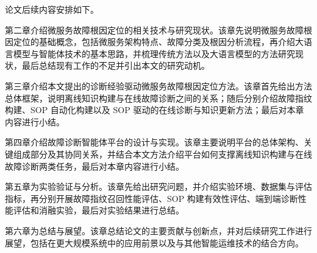 论文后续内容安排如下。

第二章介绍微服务故障根因定位的相关技术与研究现状。该章先说明微服务故障根因定位的基础概念，包括微服务架构特点、故障分类及根因分析流程，再介绍大语言模型与智能体技术的基本思路，并梳理传统方法以及大语言模型的方法研究现状，最后总结现有工作的不足并引出本文的研究动机。

第三章介绍本文提出的诊断经验驱动微服务故障根因定位方法。该章首先给出方法总体框架，说明离线知识构建与在线故障诊断之间的关系；随后分别介绍故障指纹构建、SOP 自动化构建以及 SOP 驱动的在线诊断与知识更新方法；最后对本章内容进行小结。

第四章介绍故障诊断智能体平台的设计与实现。该章主要说明平台的总体架构、关键组成部分及其协同关系，并结合本文方法介绍平台如何支撑离线知识构建与在线故障诊断两类任务，最后对本章内容进行小结。

第五章为实验验证与分析。该章先给出研究问题，并介绍实验环境、数据集与评估指标，再分别开展故障指纹召回性能评估、SOP 构建有效性评估、端到端诊断性能评估和消融实验，最后对实验结果进行总结。

第六章为总结与展望。该章总结论文的主要贡献与创新点，并对后续研究工作进行展望，包括在更大规模系统中的应用前景以及与其他智能运维技术的结合方向。
